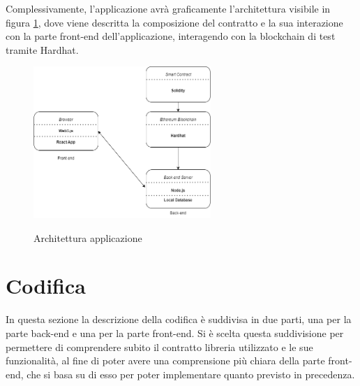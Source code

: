 \newpage
Complessivamente, l'applicazione avrà graficamente l'architettura visibile in figura \ref{fig:architettura}, dove viene descritta la composizione del contratto 
e la sua interazione con la parte front-end dell'applicazione, interagendo con la blockchain di test tramite Hardhat.
\begin{figure}[h]
    \centering
    \includegraphics[width=0.6\textwidth, alt={Descrizione dell'architettura dell'applicazione}]{immagini/architettura.png}
    \caption{Architettura applicazione} \label{fig:architettura}
\end{figure}

\section{Codifica}\label{sec:codifica-requisiti}

In questa sezione la descrizione della codifica è suddivisa in due parti, una per la parte back-end e una per la parte front-end.
Si è scelta questa suddivisione per permettere di comprendere subito il contratto libreria utilizzato e le sue funzionalità,
al fine di poter avere una comprensione più chiara della parte front-end, che si basa su di esso per poter implementare quanto previsto in precedenza.

